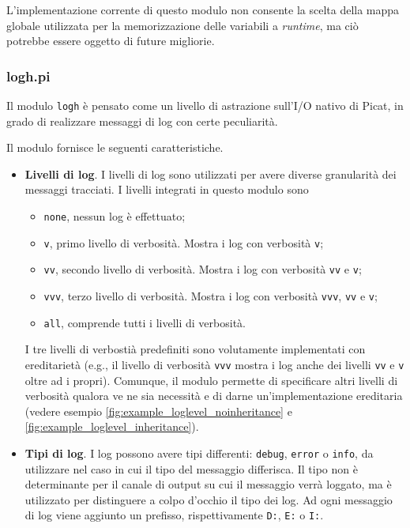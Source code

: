 \documentclass[12pt,a4paper,openright]{book}  %
\begin{document}
L'implementazione corrente di questo modulo non consente la scelta
della mappa globale utilizzata per la memorizzazione delle variabili a
\emph{runtime}, ma ciò potrebbe essere oggetto di future migliorie.

\subsubsection{log\textunderscore h.pi}

Il modulo \texttt{log\textunderscore h} è pensato come un livello di
astrazione sull'I/O nativo di Picat, in grado di realizzare messaggi
di log con certe peculiarità.

Il modulo fornisce le seguenti caratteristiche.

\begin{itemize}
	\item \textbf{Livelli di log}. I livelli di log sono
          utilizzati per avere diverse granularità dei messaggi
          tracciati. I livelli integrati in questo modulo sono
	\begin{itemize}
		\item \texttt{none}, nessun log è effettuato;
		\item \texttt{v}, primo livello di verbosità. Mostra i
                  log con verbosità \texttt{v};
		\item \texttt{vv}, secondo livello di
                  verbosità. Mostra i log con verbosità \texttt{vv} e
                  \texttt{v};
		\item \texttt{vvv}, terzo livello di verbosità. Mostra
                  i log con verbosità \texttt{vvv}, \texttt{vv} e
                  \texttt{v};
		\item \texttt{all}, comprende tutti i livelli di
                  verbosità.
	\end{itemize}
	I tre livelli di verbostià predefiniti sono volutamente
        implementati con ereditarietà (e.g., il livello di verbosità
        \texttt{vvv} mostra i log anche dei livelli \texttt{vv} e
        \texttt{v} oltre ad i propri). Comunque, il modulo permette di
        specificare altri livelli di verbosità qualora ve ne sia
        necessità e di darne un'implementazione ereditaria (vedere
        esempio \ref{fig:example_loglevel_noinheritance} e
        \ref{fig:example_loglevel_inheritance}).

	\item \textbf{Tipi di log}. I log possono avere tipi
          differenti: \texttt{debug}, \texttt{error} o \texttt{info},
          da utilizzare nel caso in cui il tipo del messaggio
          differisca. Il tipo non è determinante per il canale di
          output su cui il messaggio verrà loggato, ma è utilizzato
          per distinguere a colpo d'occhio il tipo dei log. Ad ogni
          messaggio di log viene aggiunto un prefisso, rispettivamente
          \texttt{D:}, \texttt{E:} o \texttt{I:}.


\end{itemize}
\end{document}
